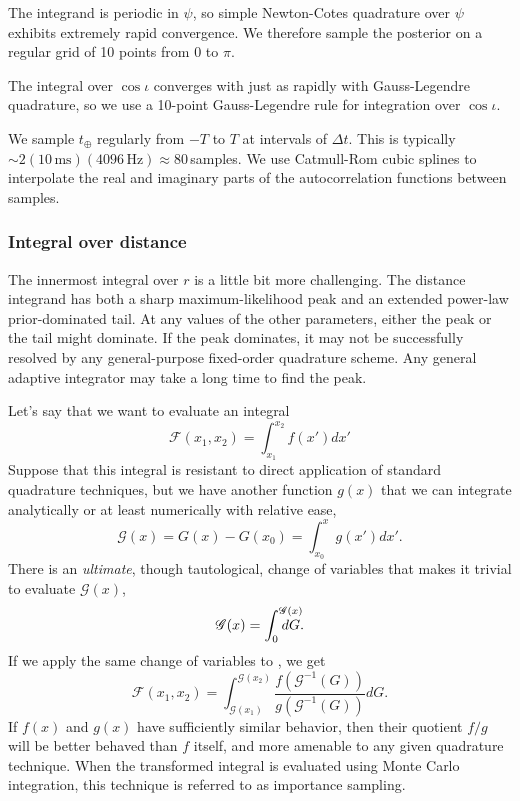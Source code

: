 \documentclass{iopart}
\def\mathrlap{\mathpalette\mathrlapinternal}
\def\mathrlapinternal#1#2{\rlap{$\mathsurround=0pt#1{#2}$}}
\begin{document}
The integrand is periodic in $\psi$, so simple Newton-Cotes quadrature over $\psi$ exhibits extremely rapid convergence. We therefore sample the posterior on a regular grid of 10 points from 0 to $\pi$.

The integral over $\cos\iota$ converges with just as rapidly with Gauss-Legendre quadrature, so we use a 10\nobreakdashes-point Gauss-Legendre rule for integration over $\cos\iota$.

We sample $t_\oplus$ regularly from $-T$ to $T$ at intervals of $\Delta t$. This is typically $\sim 2 (10\,\mathrm{ms})(4096\,\mathrm{Hz}) \approx 80$\,samples. We use Catmull\nobreakdashes-Rom cubic splines to interpolate the real and imaginary parts of the autocorrelation functions between samples.

\subsubsection{Integral over distance}

The innermost integral over $r$ is a little bit more challenging. The distance integrand has both a sharp maximum\nobreakdashes-likelihood peak and an extended power\nobreakdashes-law prior\nobreakdashes-dominated tail. At any values of the other parameters, either the peak or the tail might dominate. If the peak dominates, it may not be successfully resolved by any general\nobreakdashes-purpose fixed\nobreakdashes-order quadrature scheme. Any general adaptive integrator may take a long time to find the peak.

Let's say that we want to evaluate an integral
%
\begin{equation}\label{eq:importance-sampling-difficult-integral}
    \mathscr{F}(x_1, x_2) = \int_{x_1}^{x_2} f(x') dx'
\end{equation}
%
Suppose that this integral is resistant to direct application of standard quadrature techniques, but we have another function $g(x)$ that we can integrate analytically or at least numerically with relative ease,
%
\begin{equation}
    \mathscr{G}(x) = G(x) - G(x_0) = \int_{x_0}^x g(x') dx'.
\end{equation}
%
There is an \emph{ultimate}, though tautological, change of variables that makes it trivial to evaluate $\mathscr{G}(x)$,
%
\begin{equation}
    \mathscr{G}(x) = \int_0^{\mathrlap{\mathscr{G}(x)}} dG.
\end{equation}
%
If we apply the same change of variables to , we get
%
\begin{equation}\label{eq:importance-sampling}
    \mathscr{F}(x_1, x_2) = \int_{\mathscr{G}(x_1)}^{\mathscr{G}(x_2)} \frac{f(\mathscr{G}^{-1}(G))}{g(\mathscr{G}^{-1}(G))} dG.
\end{equation}
%
If $f(x)$ and $g(x)$ have sufficiently similar behavior, then their quotient $f/g$ will be better behaved than $f$ itself, and more amenable to any given quadrature technique. When the transformed integral  is evaluated using Monte Carlo integration, this technique is referred to as importance sampling.
\end{document}
